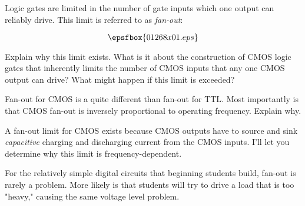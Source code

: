 

Logic gates are limited in the number of gate inputs which one output can reliably drive.  This limit is referred to as {\it fan-out}:

$$\epsfbox{01268x01.eps}$$

Explain why this limit exists.  What is it about the construction of CMOS logic gates that inherently limits the number of CMOS inputs that any one CMOS output can drive?  What might happen if this limit is exceeded?

Fan-out for CMOS is a quite different than fan-out for TTL.  Most importantly is that CMOS fan-out is inversely proportional to operating frequency.  Explain why.







A fan-out limit for CMOS exists because CMOS outputs have to source and sink {\it capacitive} charging and discharging current from the CMOS inputs.  I'll let you determine why this limit is frequency-dependent.







For the relatively simple digital circuits that beginning students build, fan-out is rarely a problem.  More likely is that students will try to drive a load that is too "heavy," causing the same voltage level problem.




